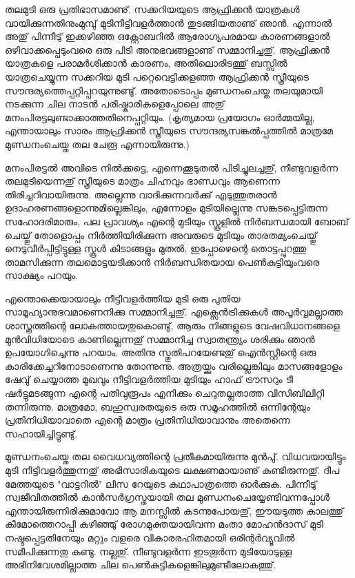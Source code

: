 ﻿
\vskip 2pt

തലമുടി ഒരു പ്രതിഭാസമാണു്. സക്കറിയയുടെ ആഫ്രിക്കന്‍ യാത്രകള്‍ വായിക്കുന്നതിനുംമുമ്പു് മുടിനീട്ടിവളര്‍ത്താന്‍ 
തുടങ്ങിയതാണു് ഞാന്‍. എന്നാല്‍ അതു് പിന്നീടു് ഇക്കഴിഞ്ഞ ഒക്റ്റോബറില്‍ ആരോഗ്യപരമായ കാരണങ്ങളാല്‍ 
ഒഴിവാക്കപ്പെടുംവരെ ഒരു പിടി അനുഭവങ്ങളാണു് സമ്മാനിച്ചതു്. ആഫ്രിക്കന്‍ യാത്രകളെ പരാമര്‍ശിക്കാന്‍ കാരണം, 
അതിലൊരിടത്തു് ബസ്സില്‍ യാത്രചെയ്യുന്ന സക്കറിയ മുടി പറ്റെവെട്ടിക്കളഞ്ഞ ആഫ്രിക്കന്‍ സ്ത്രീയുടെ 
സൗന്ദര്യത്തെപ്പറ്റിപ്പറയുന്നുണ്ടു്. അതോടൊപ്പം മുണ്ഡനംചെയ്ത തലയുമായി നടക്കുന്ന ചില നാടന്‍ 
പരിഷ്കാരികളെപ്പോലെ അതു് മനംപിരട്ടലുണ്ടാക്കാത്തതിനെപ്പറ്റിയും. (കൃത്യമായ പ്രയോഗം ഓര്‍മ്മയില്ല, എന്തായാലും 
സാരം ആഫ്രിക്കന്‍ സ്ത്രീയുടെ സൗന്ദര്യസങ്കല്‍പ്പത്തില്‍ മാത്രമേ മുണ്ഡനംചെയ്ത തല ചേരൂ എന്നായിരുന്നു.)

മനംപിരട്ടല്‍ അവിടെ നില്‍ക്കട്ടെ, എന്നെക്കൂടുതല്‍ പിടിച്ചുലച്ചതു്, നീണ്ടുവളര്‍ന്ന തലമുടിയെന്നതു് സ്ത്രീയുടെ മാത്രം ചിഹ്നവും 
ഭാണ്ഡവും ആണെന്ന തിരിച്ചറിവായിരുന്നു. അല്ലെന്നു വാദിക്കുന്നവര്‍ക്കു് എടുത്തുതരാന്‍ ഉദാഹരണങ്ങളൊന്നുമില്ലെങ്കിലും, 
എന്നോളം മുടിയില്ലെന്നു സങ്കടപ്പെട്ടിരുന്ന സഹോദരിമാരും, പല പ്രാവശ്യം എന്റെ മുടിയും സ്കൂളില്‍ നിര്‍ബന്ധമായി ബോബ് 
ചെയ്തു് തോളൊപ്പം നിര്‍ത്തിയിരിക്കുന്ന അവരുടെ മുടിയും താരതമ്യംചെയ്തു് നെടുവീര്‍പ്പിട്ടിട്ടുള്ള സ്കൂള്‍ കിടാങ്ങളും മുതല്‍, 
ഇപ്പോഴെന്റെ തൊട്ടപ്പുറത്തു താമസിക്കുന്ന തലമൊട്ടയടിക്കാന്‍ നിര്‍ബന്ധിതയായ പെണ്‍കുട്ടിയുംവരെ സാക്ഷ്യം പറയും.

എന്തൊക്കെയായാലും നീട്ടിവളര്‍ത്തിയ മുടി ഒരു പുതിയ സാമൂഹ്യാനുഭവമാണെനിക്കു സമ്മാനിച്ചതു്. എക്സെന്‍ട്രിക്കുകള്‍ 
അപൂര്‍വ്വമല്ലാത്ത ശാസ്ത്രത്തിന്റെ ലോകത്തായതുകൊണ്ടു്, ആരും നിങ്ങളുടെ വേഷവിധാനങ്ങളെ മുന്‍വിധിയോടെ 
കാണില്ലെന്നതു് സമ്മാനിച്ച സ്വാതന്ത്ര്യം ശരിക്കും ഞാന്‍ ഉപയോഗിച്ചെന്നു പറയാം. അതിനു സ്തുതിപറയേണ്ടതു് ഐന്‍സ്റ്റീന്റെ 
ഒരു കാരിക്കേച്ചറിനോടാണെന്നു തോന്നുന്നു. അത്രയ്ക്കും വരില്ലെങ്കിലും മാസങ്ങളോളം ഷേവു് ചെയ്യാത്ത മുഖവും നീട്ടിവളര്‍ത്തിയ 
മുടിയും ഹാഫ് ട്രൗസറും ടീ ഷര്‍ട്ടുമടങ്ങുന്ന എന്റെ പതിവുരൂപം എനിക്കും ചെറുതല്ലതാത്ത വിസിബിലിറ്റി തന്നിരുന്നു. 
മാത്രമോ, ബഹുസ്വരതയുടെ ഒരു സമൂഹത്തില്‍ ഒന്നിന്റേയും പ്രതിനിധിയാവാതെ എന്റെ മാത്രം പ്രതിനിധിയാവാനും 
അതെന്നെ സഹായിച്ചിട്ടുണ്ടു്.

മുണ്ഡനംചെയ്ത തല വൈധവ്യത്തിന്റെ പ്രതീകമായിരുന്നു മുന്‍പു്. വിധവയായിട്ടും മുടി നീട്ടിവളര്‍ത്തുന്നതു് അഭിസാരികയുടെ 
ലക്ഷണമായാണു് കണ്ടിരുന്നതു്. ദീപ മേത്തയുടെ "വാട്ടറില്‍" ലിസ റേയുടെ കഥാപാത്രത്തെ ഓര്‍ക്കുക. പിന്നീടു് 
സ്വജീവിതത്തില്‍ കാന്‍സര്‍ഗ്രസ്തയായി തല മുണ്ഡനംചെയ്യേണ്ടിവന്നപ്പോള്‍ എന്തായിരുന്നിരിക്കുമാവോ ആ മനസ്സില്‍ 
കടന്നുപോയതു്, ഈയടുത്ത കാലത്തു് കീമോത്തെറാപ്പി കഴിഞ്ഞു് രോഗമുക്തയായിവന്ന മംതാ മോഹന്‍ദാസ് മുടി 
നഷ്ടപ്പെട്ടതിനേയും മറ്റും വളരെ വികാരരഹിതമായി ഒരിന്റര്‍വ്യൂവില്‍ സമീപിക്കുന്നതു കണ്ടു. നല്ലതു്. നീണ്ടുവളര്‍ന്ന ഇടതൂര്‍ന്ന 
മുടിയോടുള്ള അഭിനിവേശമില്ലാത്ത ചില പെണ്‍കുട്ടികളെങ്കിലുമുണ്ടീലോകത്തു്.

